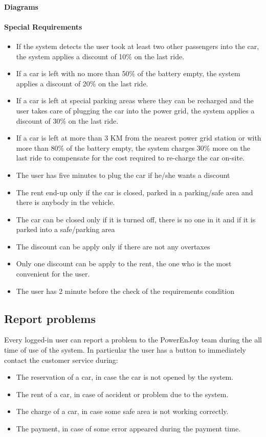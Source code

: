 \paragraph{Diagrams}
\paragraph{Special Requirements}
\begin{itemize}
	\item If the system detects the user took at least two other passengers into the car, the system applies a discount of 10\% on the last ride.
	\item If a car is left with no more than 50\% of the battery empty, the system applies a discount of 20\% on the last ride.
	\item If a car is left at special parking areas where they can be recharged and the user takes care of plugging the car into the power grid, the system applies a discount of 30\% on the last ride.
	\item If a car is left at more than 3 KM from the nearest power grid station or with more than 80\% of the battery empty, the system charges 30\% more on the last ride to compensate for the cost required to re-charge the car on-site.
	\item The user has five minutes to plug the car if he/she wants a discount
	\item The rent end-up only if the car is closed, parked in a parking/safe area and there is anybody in the vehicle.
	\item The car can be closed only if it is turned off, there is no one in it and if it is parked into a safe/parking area
	\item The discount can be apply only if there are not any overtaxes
	\item Only one discount can be apply to the rent, the one who is the most convenient for the user.
	\item The user has 2 minute before the check of the requirements condition 
\end{itemize}

\subsection{Report problems}
Every logged-in user can report a problem to the PowerEnJoy team during the all time of use of the system. In particular the user has a button to immediately contact the customer service during:
\begin{itemize}
	\item The reservation of a car, in case the car is not opened by the system.
	\item The rent of a car, in case of accident or problem due to the system.
	\item The charge of a car, in case some safe area is not working correctly.
	\item The payment, in case of some error appeared during the payment time.
\end{itemize}
